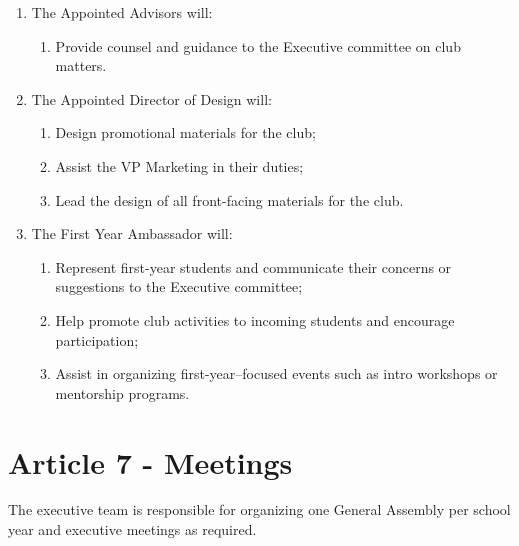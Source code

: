 \begin{enumerate}
    \item The Appointed Advisors will:
    \begin{enumerate}
        \item Provide counsel and guidance to the Executive committee on club matters.
    \end{enumerate}
    \item The Appointed Director of Design will:
    \begin{enumerate}
        \item Design promotional materials for the club;
        \item Assist the VP Marketing in their duties;
        \item Lead the design of all front-facing materials for the club.
    \end{enumerate}
    \item The First Year Ambassador will:
    \begin{enumerate}
        \item Represent first-year students and communicate their concerns or suggestions to the Executive committee;
        \item Help promote club activities to incoming students and encourage participation;
        \item Assist in organizing first-year–focused events such as intro workshops or mentorship programs.
    \end{enumerate}
\end{enumerate}

\section*{Article 7 - Meetings}

The executive team is responsible for organizing one General Assembly per school year and executive meetings as required.

